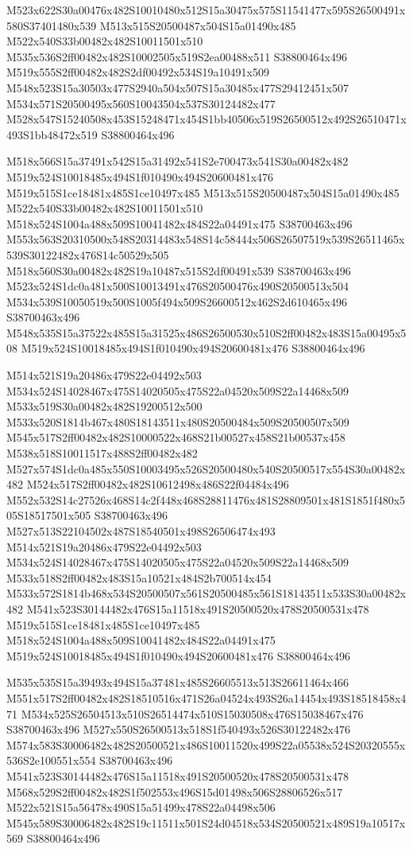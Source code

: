 \documentclass{article}
\begin{document}
\begin{multicols}{2}
M523x622S30a00476x482S10010480x512S15a30475x575S11541477x595S26500491x580S37401480x539 M513x515S20500487x504S15a01490x485 M522x540S33b00482x482S10011501x510 M535x536S2ff00482x482S10002505x519S2ea00488x511 S38800464x496 M519x555S2ff00482x482S2df00492x534S19a10491x509 M548x523S15a30503x477S2940a504x507S15a30485x477S29412451x507 M534x571S20500495x560S10043504x537S30124482x477 M528x547S15240508x453S15248471x454S1bb40506x519S26500512x492S26510471x493S1bb48472x519 S38800464x496

M518x566S15a37491x542S15a31492x541S2e700473x541S30a00482x482 M519x524S10018485x494S1f010490x494S20600481x476 M519x515S1ce18481x485S1ce10497x485 M513x515S20500487x504S15a01490x485 M522x540S33b00482x482S10011501x510 M518x524S1004a488x509S10041482x484S22a04491x475 S38700463x496 M553x563S20310500x548S20314483x548S14c58444x506S26507519x539S26511465x539S30122482x476S14c50529x505 M518x560S30a00482x482S19a10487x515S2df00491x539 S38700463x496 M523x524S1dc0a481x500S10013491x476S20500476x490S20500513x504 M534x539S10050519x500S1005f494x509S26600512x462S2d610465x496 S38700463x496 M548x535S15a37522x485S15a31525x486S26500530x510S2ff00482x483S15a00495x508 M519x524S10018485x494S1f010490x494S20600481x476 S38800464x496

M514x521S19a20486x479S22e04492x503 M534x524S14028467x475S14020505x475S22a04520x509S22a14468x509 M533x519S30a00482x482S19200512x500 M533x520S1814b467x480S18143511x480S20500484x509S20500507x509 M545x517S2ff00482x482S10000522x468S21b00527x458S21b00537x458 M538x518S10011517x488S2ff00482x482 M527x574S1dc0a485x550S10003495x526S20500480x540S20500517x554S30a00482x482 M524x517S2ff00482x482S10612498x486S22f04484x496 M552x532S14c27526x468S14c2f448x468S28811476x481S28809501x481S1851f480x505S18517501x505 S38700463x496 M527x513S22104502x487S18540501x498S26506474x493 M514x521S19a20486x479S22e04492x503 M534x524S14028467x475S14020505x475S22a04520x509S22a14468x509 M533x518S2ff00482x483S15a10521x484S2b700514x454 M533x572S1814b468x534S20500507x561S20500485x561S18143511x533S30a00482x482 M541x523S30144482x476S15a11518x491S20500520x478S20500531x478 M519x515S1ce18481x485S1ce10497x485 M518x524S1004a488x509S10041482x484S22a04491x475 M519x524S10018485x494S1f010490x494S20600481x476 S38800464x496

M535x535S15a39493x494S15a37481x485S26605513x513S26611464x466 M551x517S2ff00482x482S18510516x471S26a04524x493S26a14454x493S18518458x471 M534x525S26504513x510S26514474x510S15030508x476S15038467x476 S38700463x496 M527x550S26500513x518S1f540493x526S30122482x476 M574x583S30006482x482S20500521x486S10011520x499S22a05538x524S20320555x536S2e100551x554 S38700463x496 M541x523S30144482x476S15a11518x491S20500520x478S20500531x478 M568x529S2ff00482x482S1f502553x496S15d01498x506S28806526x517 M522x521S15a56478x490S15a51499x478S22a04498x506 M545x589S30006482x482S19c11511x501S24d04518x534S20500521x489S19a10517x569 S38800464x496


\end{multicols}
\end{document}
